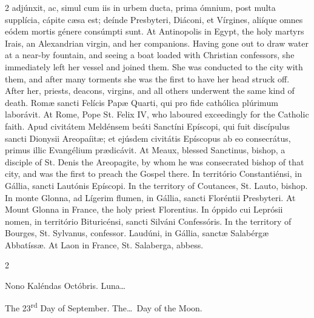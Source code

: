 \begin{paracol}{2}
 adjúnxit, ac, simul cum iis in urbem ducta, prima ómnium, post multa 
 supplícia, cápite cæsa est; deínde Presbyteri, Diáconi, et Vírgines, aliíque 
 omnes eódem mortis génere consúmpti sunt.
\switchcolumn
{}
At Antinopolis in Egypt, the holy 
 martyrs Irais, an Alexandrian virgin, and her companions. Having gone 
 out to draw water at a near-by fountain, and seeing a boat loaded with 
 Christian confessors, she immediately left her vessel and joined them. 
 She was conducted to the city with them, and after many torments she was the 
 first to have her head struck off. After her, priests, deacons, 
 virgins, and all others underwent the same kind of death.
\switchcolumn*
{}
Romæ sancti Felícis 
 Papæ Quarti, qui pro fide cathólica plúrimum laborávit.
\switchcolumn
{}
At Rome, Pope St. Felix IV, who 
 laboured exceedingly for the Catholic faith.
\switchcolumn*
{}
Apud civitátem 
 Meldénsem beáti Sanctíni Epíscopi, qui fuit discípulus sancti Dionysii 
 Areopaíitæ; et ejúsdem civitátis Epíscopus ab eo consecrátus, primus illic 
 Evangélium prædicávit.
\switchcolumn
{}
At Meaux, blessed Sanctinus, bishop, 
 a disciple of St. Denis the Areopagite, by whom he was consecrated bishop of 
 that city, and was the first to preach the Gospel there.
\switchcolumn*
{}
In território 
 Constantiénsi, in Gállia, sancti Lautónis Epíscopi.
\switchcolumn
{}
In the territory of Coutances, St. 
 Lauto, bishop.
\switchcolumn*
{}
In monte Glonna, ad 
 Lígerim flumen, in Gállia, sancti Floréntii Presbyteri.
\switchcolumn
{}
At Mount Glonna in France, the holy 
 priest Florentius.
\switchcolumn*
{}
In óppido cui Leprósii 
 nomen, in território Bituricénsi, sancti Silváni Confessóris.
\switchcolumn
{}
In the territory of Bourges, St. 
 Sylvanus, confessor.
\switchcolumn*
{}
Laudúni, in Gállia, 
 sanctæ Salabérgæ Abbatíssæ.
\switchcolumn
{}
At Laon in France, St. Salaberga, 
 abbess.
\switchcolumn*
{}
\end{paracol}


\begin{paracol}{2}
\begin{center}{\color{gregoriocolor} Nono Kaléndas Octóbris. 
 Luna\dots\ }\end{center}
\switchcolumn
{}
\begin{center}{\color{gregoriocolor} The   23\textsuperscript{rd} Day of 
 September. The\dots\ Day of the Moon.}\end{center}
\end{paracol}

